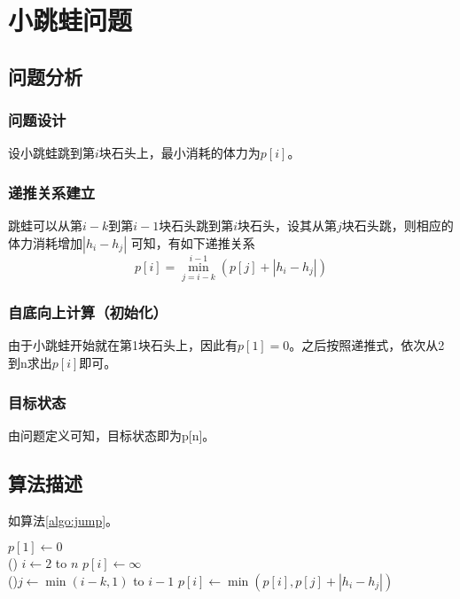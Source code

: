 \section{小跳蛙问题}

\subsection{问题分析}

\subsubsection{问题设计}

设小跳蛙跳到第$i$块石头上，最小消耗的体力为$p[i]$。

\subsubsection{递推关系建立}
跳蛙可以从第$i-k$到第$i-1$块石头跳到第$i$块石头，设其从第$j$块石头跳，则相应的体力消耗增加$|h_i - h_j|$
可知，有如下递推关系 
\begin{equation}
    \displaystyle
    p[i] = \min_{j = i-k}^{i-1}(p[j] + |h_i - h_j|)
\end{equation}

\subsubsection{自底向上计算（初始化）}

由于小跳蛙开始就在第1块石头上，因此有$p[1] = 0$。之后按照递推式，依次从2到n求出$p[i]$即可。

\subsubsection{目标状态}

由问题定义可知，目标状态即为p[n]。

\subsection{算法描述}
如算法\ref{algo:jump}。

\begin{algorithm}[H]
    \caption{$jump(h[1..n],k)$}\label{algo:jump}
    $p[1] \leftarrow 0$\\
    \For(){ $i \leftarrow 2$ to $n$ }{
       $ p[i] \leftarrow \infty$\\
       \For(){$j\leftarrow \min(i-k,1)$ to $i-1$}{
            $p[i] \leftarrow \min(p[i],p[j] + |h_i-h_j|)$\\
       } 
    }
\end{algorithm}


